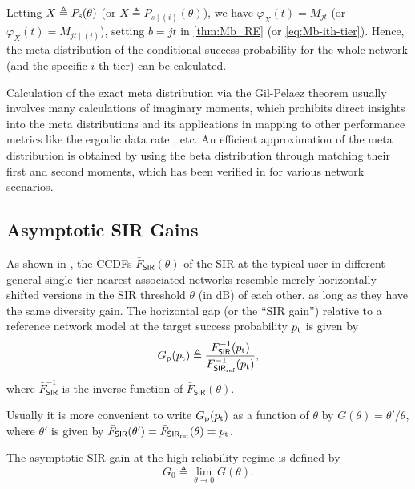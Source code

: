 \documentclass[12pt,draftclsnofoot,journal,onecolumn]{IEEEtran}
\def\SIR{\mathsf{SIR}}
\def\Ps{P_{\rm s}}
\begin{document}
Letting $X\triangleq\Ps(\theta)$ (or $X\triangleq P_{s\mid(i)}(\theta)$), we have $\varphi_X(t)=M_{jt}$ (or $\varphi_X(t)=M_{jt\mid(i)}$), setting $b=jt$ in \eqref{thm:Mb_RE} (or \eqref{eq:Mb-ith-tier}). Hence, the meta distribution of the conditional success probability for the whole network (and the specific $i$-th tier) can be calculated.

Calculation of the exact meta distribution via the Gil-Pelaez theorem usually involves many calculations of imaginary moments, which prohibits direct insights into the meta distributions and its applications in mapping to other performance metrics like the ergodic data rate \cite{Deng17}, etc. An efficient approximation of the meta distribution is obtained by using the beta distribution through matching their first and second moments, which has been verified in \cite{MHmeta, Deng17, 2017mHaenggiTcom, YWmetaPower, YWmetaIC} for various network scenarios. 
  
\subsection{Asymptotic SIR Gains}

As shown in \cite{Haenggi14wcl,AGuo15ADG,Ganti16}, the CCDFs $\bar F_{\SIR}(\theta)$ of the SIR at the typical user in different general single-tier nearest-associated networks resemble merely horizontally shifted versions in the SIR threshold $\theta$ (in dB) of each other, as long as they have the same diversity gain. The horizontal gap (or the ``SIR gain'') relative to a reference network model at the target success probability $p_{\rm t}$ is given by 
\begin{equation}\label{eq:HorizonGap}
	G_{\rm p}(p_{\rm t}) \triangleq \frac{\bar F_{\SIR}^{-1}(p_{\rm t})}{\bar F_{\SIR_{\rm ref}}^{-1}(p_{\rm t})},
\end{equation}
where $\bar F_{\SIR}^{-1}$ is the inverse function of $\bar F_{\SIR}(\theta)$. 

Usually it is more convenient to write $G_{\rm p}(p_{\rm t})$ as a function of $\theta$ by $G(\theta)=\theta'/\theta$, 
where $\theta'$ is given by $\bar F_{\SIR}(\theta')=\bar F_{\SIR_{\rm ref}}(\theta)=p_{\rm t}$.

The asymptotic SIR gain at the high-reliability regime is defined by
\begin{equation}\label{eq:HorizonGap3}
G_0 \triangleq \lim_{\theta\to 0}G(\theta).
\end{equation}
\end{document}
